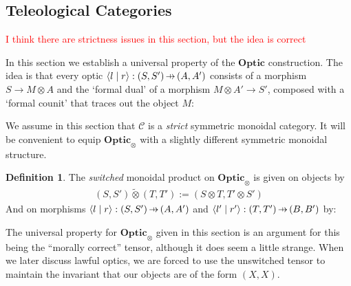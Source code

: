 \documentclass[11pt,letterpaper]{article}
\theoremstyle{plain}
\newtheorem{proposition}[theorem]{Proposition}
\theoremstyle{definition}
\newtheorem{definition}[theorem]{Definition}
\newcommand{\C}{\mathscr{C}}
\newcommand{\Optic}{\mathbf{Optic}}
\newcommand{\switched}{\mathbin{\tilde{\otimes}}}
\newcommand{\rep}[2]{{\ensuremath \left\langle #1 \mid #2 \right\rangle}}
\newcommand{\hto}{\ensuremath{\,\mathaccent\shortmid\rightarrow\,}}
\newcommand{\todo}[1]{\textcolor{red}{\small #1}}
\begin{document}

\subsection{Teleological Categories}\label{sec:teleological-categories}
\todo{I think there are strictness issues in this section, but the idea is correct}

In this section we establish a universal property of the $\Optic$ construction. The idea is that every optic $\rep{l}{r} : (S, S') \hto (A, A')$ consists of a morphism $S \to M \otimes A$ and the `formal dual' of a morphism $M \otimes A' \to S'$, composed with a `formal counit' that traces out the object $M$:
\begin{center}
  
\end{center}

We assume in this section that $\C$ is a \emph{strict} symmetric monoidal category. It will be convenient to equip $\Optic_\otimes$ with a slightly different symmetric monoidal structure.

\begin{definition}
  The \emph{switched} monoidal product on $\Optic_\otimes$ is given on objects by
  \begin{align*}
    (S, S') \switched (T, T') := (S \otimes T, T' \otimes S')
  \end{align*}
  And on morphisms $\rep{l}{r} : (S, S') \hto (A, A')$ and $\rep{l'}{r'} : (T, T') \hto (B, B')$ by:
  \begin{center}
    
  \end{center}
\end{definition}

The universal property for $\Optic_\otimes$ given in this section is an argument for this being the ``morally correct'' tensor, although it does seem a little strange. When we later discuss lawful optics, we are forced to use the unswitched tensor to maintain the invariant that our objects are of the form $(X, X)$.
\end{document}
